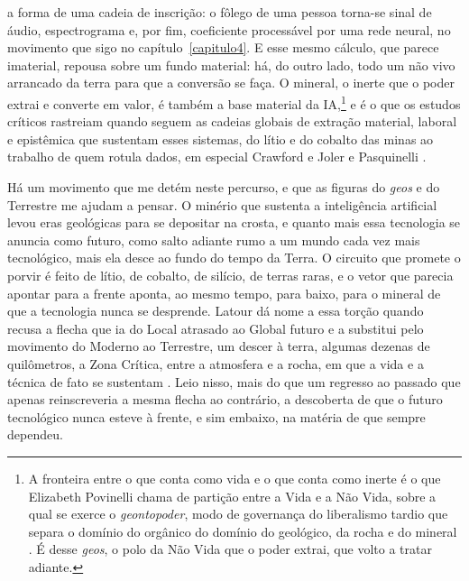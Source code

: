a forma de uma cadeia de inscrição: o fôlego de uma pessoa torna-se sinal de áudio, espectrograma e, por fim, coeficiente processável por uma rede neural, no movimento que sigo no capítulo~\ref{capitulo4}. E esse mesmo cálculo, que parece imaterial, repousa sobre um fundo material: há, do outro lado, todo um não vivo arrancado da terra para que a conversão se faça. O mineral, o inerte que o poder extrai e converte em valor, é também a base material da IA,\footnote{A fronteira entre o que conta como vida e o que conta como inerte é o que Elizabeth Povinelli chama de partição entre a Vida e a Não Vida, sobre a qual se exerce o \textit{geontopoder}, modo de governança do liberalismo tardio que separa o domínio do orgânico do domínio do geológico, da rocha e do mineral \parencite{Povinelli2023Geontologias}. É desse \textit{geos}, o polo da Não Vida que o poder extrai, que volto a tratar adiante.} e é o que os estudos críticos rastreiam quando seguem as cadeias globais de extração material, laboral e epistêmica que sustentam esses sistemas, do lítio e do cobalto das minas ao trabalho de quem rotula dados, em especial Crawford e Joler \parencite{Crawford_Joler_CalculatingEmpires_2023, Crawford2018Anatomy} e Pasquinelli \parencite{pasquinelli2020nooscope, Pasquinelli_EyeMaster_2023}.

Há um movimento que me detém neste percurso, e que as figuras do \textit{geos} e do Terrestre me ajudam a pensar. O minério que sustenta a inteligência artificial levou eras geológicas para se depositar na crosta, e quanto mais essa tecnologia se anuncia como futuro, como salto adiante rumo a um mundo cada vez mais tecnológico, mais ela desce ao fundo do tempo da Terra. O circuito que promete o porvir é feito de lítio, de cobalto, de silício, de terras raras, e o vetor que parecia apontar para a frente aponta, ao mesmo tempo, para baixo, para o mineral de que a tecnologia nunca se desprende. Latour dá nome a essa torção quando recusa a flecha que ia do Local atrasado ao Global futuro e a substitui pelo movimento do Moderno ao Terrestre, um descer à terra, algumas dezenas de quilômetros, a Zona Crítica, entre a atmosfera e a rocha, em que a vida e a técnica de fato se sustentam \parencite{Latour2020Onde}. Leio nisso, mais do que um regresso ao passado que apenas reinscreveria a mesma flecha ao contrário, a descoberta de que o futuro tecnológico nunca esteve à frente, e sim embaixo, na matéria de que sempre dependeu.

